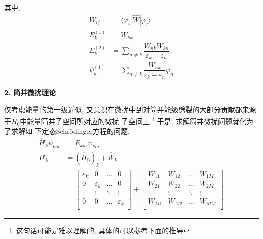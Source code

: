 \documentclass[a4paper, 11pt]{article}
\begin{document}
\begin{spacing}{1.2}
          其中,
          \begin{equation}
            \begin{aligned}
              W_{ij} &= \langle\varphi_i\left|\hat{W}\right|\varphi_j\rangle\\
              E_k^{(1)} &= W_{kk}\\
              E_k^{(2)} &= \sum_{n\ne{}k}\dfrac{W_{nk}W_{kn}}{\varepsilon_k-\varepsilon_n}\\
              \psi_k^{(1)} &= \sum_{n\ne{}k}\dfrac{W_{nk}}{\varepsilon_k-\varepsilon_n}\varphi_n
            \end{aligned}
          \end{equation}

          \textbf{2. 简并微扰理论}

          仅考虑能量的第一级近似, 又意识在微扰中到对简并能级劈裂的大部分贡献都来源于$H_0$中能量简并子空间所对应的微扰
          子空间上.\footnote{这句话可能是难以理解的, 具体的可以参考下面的推导} 于是, 求解简并微扰问题就化为了求解如
          下定态Schr\"odinger方程的问题, 
          \begin{equation}
            \begin{aligned}
              \hat{H}_k\psi_{km} &= E_{km}\psi_{km} \\
              H_k &=(\hat{H}_0)_k + \hat{W}_k\\
                  &=\begin{bmatrix}
                    \varepsilon_k & 0 & \ldots & 0\\
                    0 & \varepsilon_k & \ldots & 0\\
                    \vdots & \vdots & \ddots & \vdots\\
                    0 & 0 & \ldots & \varepsilon_k\\
                    \end{bmatrix} + %
                    \begin{bmatrix}
                      W_{11} & W_{12} & \ldots & W_{1M}\\
                      W_{21} & W_{22} & \ldots & W_{2M}\\
                      \vdots & \vdots & \ddots & \vdots\\
                      W_{M1} & W_{M2} & \ldots & W_{MM}\\
                      \end{bmatrix}  
            \end{aligned}
          \end{equation}


\end{spacing}
\end{document}
